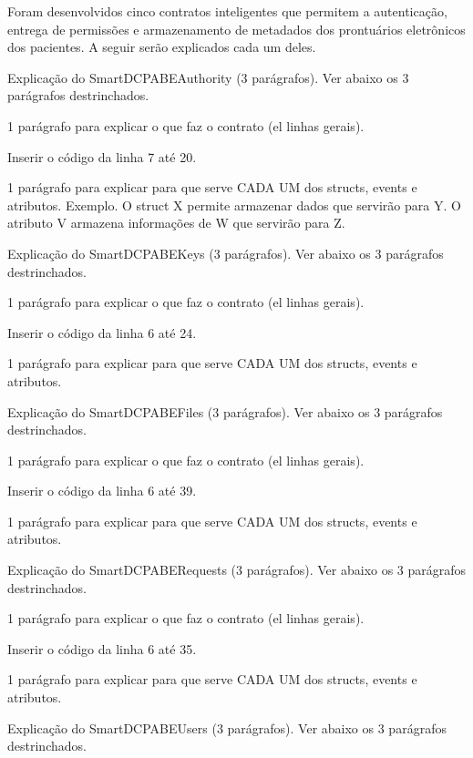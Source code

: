 \documentclass[a4paper,11pt]{article}
\begin{document}
Foram desenvolvidos cinco contratos inteligentes que permitem a autenticação, entrega de permissões e armazenamento de metadados dos prontuários eletrônicos dos pacientes. A seguir serão explicados cada um deles.


{\color{ForestGreen} Explicação do  SmartDCPABEAuthority (3 parágrafos). Ver abaixo os 3 parágrafos destrinchados.}

{\color{Magenta} 1 parágrafo para explicar o que faz o contrato (el linhas gerais).}

{\color{Magenta} Inserir o código da linha 7 até 20.}

{\color{Magenta} 1 parágrafo para explicar para que serve CADA UM dos structs, events e atributos. Exemplo. O struct X permite armazenar dados que servirão para Y. O atributo V armazena informações de W que servirão para Z.}


{\color{ForestGreen} Explicação do  SmartDCPABEKeys (3 parágrafos). Ver abaixo os 3 parágrafos destrinchados.}

{\color{Magenta} 1 parágrafo para explicar o que faz o contrato (el linhas gerais).}

{\color{Magenta} Inserir o código da linha 6 até 24.}

{\color{Magenta} 1 parágrafo para explicar para que serve CADA UM dos structs, events e atributos.}

{\color{ForestGreen} Explicação do  SmartDCPABEFiles  (3 parágrafos). Ver abaixo os 3 parágrafos destrinchados.}

{\color{Magenta} 1 parágrafo para explicar o que faz o contrato (el linhas gerais).}

{\color{Magenta} Inserir o código da linha 6 até 39.}

{\color{Magenta} 1 parágrafo para explicar para que serve CADA UM dos structs, events e atributos.}


{\color{ForestGreen} Explicação do  SmartDCPABERequests  (3 parágrafos). Ver abaixo os 3 parágrafos destrinchados.}

{\color{Magenta} 1 parágrafo para explicar o que faz o contrato (el linhas gerais).}

{\color{Magenta} Inserir o código da linha 6 até 35.}

{\color{Magenta} 1 parágrafo para explicar para que serve CADA UM dos structs, events e atributos.}


{\color{ForestGreen} Explicação do  SmartDCPABEUsers  (3 parágrafos). Ver abaixo os 3 parágrafos destrinchados.}
\end{document}
